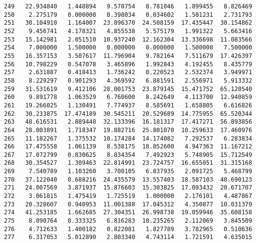 \documentclass[11pt]{article}
\begin{document}
\begin{Verbatim}[commandchars=\\\{\}]
249   22.934840   1.448894   9.570754   8.781046   1.899455   8.826469   
250    2.275179   0.000000   0.398034   0.034602   1.501231   2.731793   
251   30.104910   1.164007  23.896370  24.508159  17.435447  30.154862   
252    9.456741   4.178321   4.855538   5.575179   1.991322   5.663416   
253   15.142981   2.051510  10.937240  12.162304  13.336698  11.083566   
254    7.000000   1.500000   0.000000   0.000000   1.500000   7.500000   
255   16.357153   3.507617  11.796904   9.782164   7.511679  17.426397   
256   10.798229   0.547078   3.465896   1.992843   4.192455   8.435779   
257    2.631887   0.418413   1.736242   0.220523   2.532374   3.949971   
258    8.229297   0.901293   4.369592   6.881591   2.556971   5.913332   
259   31.531619   9.412106  28.001753  23.879145  15.471752  65.120540   
260    9.891778   1.063529   6.760600   8.242649   4.113700  12.940859   
261   19.266025   1.130491   7.774937   8.585691   1.658805   6.616826   
262   30.233875  17.474189  30.545211  20.529689  14.775955  65.520344   
263   48.616531   2.889448  32.133396  16.181317  17.417271  56.893856   
264   28.003891   1.718347  19.882716  25.801070  10.259633  17.460976   
265   11.182267   1.375532  10.174284  14.174082   7.292537   6.283834   
266   17.475558   1.061139   8.538175  18.052600   4.947363  11.167212   
267   17.072799   0.830625   8.834354   7.492923   5.748905  15.712549   
268   30.354527   1.309463  22.814991  23.724757  16.655051  31.315168   
269    7.540789   1.103260   3.700105   6.837935   2.091725   5.468799   
270   37.122040   0.688216  24.435579  13.557403  18.587103  40.690123   
271   24.007569   3.871937  15.876603  15.303825  17.093432  20.671707   
272    3.061815   1.475419   1.725519   1.000000   2.176101   4.487867   
273   20.328607   0.940953  11.001388  17.045312   4.350877  10.031379   
274   41.253185   1.662685  27.304351  26.998738  19.059946  35.608158   
275    8.090764   0.333325   6.816283  10.235265   2.112069   3.845509   
276    4.712633   1.400182   0.822081   1.827789   3.782965   0.510636   
277    6.317053   5.012890   2.803340   4.743114   1.721591   4.635015   


\end{Verbatim}
\end{document}
